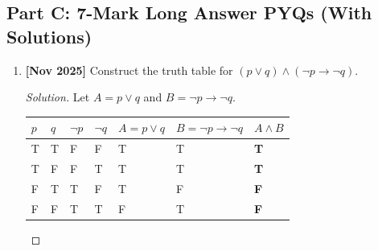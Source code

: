\documentclass[11pt,a4paper]{article}
\newenvironment{sol}{\begin{proof}[Solution]}{\end{proof}}
\begin{document}
\subsection{Part C: 7-Mark Long Answer PYQs (With Solutions)}

\begin{enumerate}[leftmargin=1.5em, label=\textbf{Q\arabic*:}]
    \item \textbf{[Nov 2025]} Construct the truth table for $(p \lor q) \land (\neg p \rightarrow \neg q)$.
    \begin{sol}
    Let $A = p \lor q$ and $B = \neg p \rightarrow \neg q$.
    \begin{table}[htbp]
    \centering
    \small
    \begin{tabularx}{\textwidth}{|*{7}{>{\centering\arraybackslash}X|}}
    \hline
    $p$ & $q$ & $\neg p$ & $\neg q$ & $A = p \lor q$ & $B = \neg p \rightarrow \neg q$ & \textbf{$A \land B$} \\ \hline
    T & T & F & F & T & T & \textbf{T} \\ \hline
    T & F & F & T & T & T & \textbf{T} \\ \hline
    F & T & T & F & T & F & \textbf{F} \\ \hline
    F & F & T & T & F & T & \textbf{F} \\ \hline
    \end{tabularx}
    \end{table}
    \end{sol}
    \vspace{6pt}


\end{enumerate}
\end{document}
